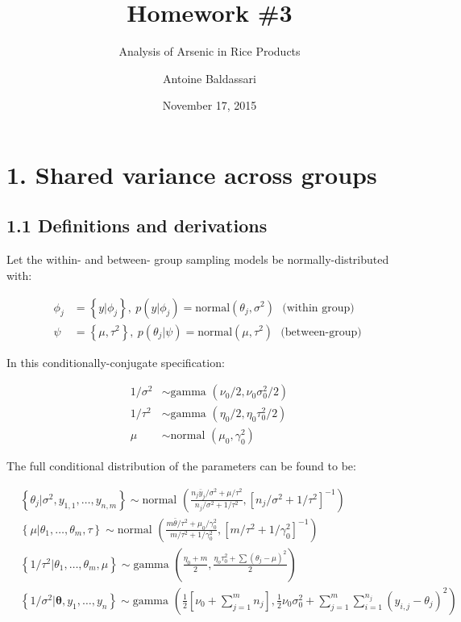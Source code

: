 \documentclass[]{article}
\title{Homework \#3}
\subtitle{Analysis of Arsenic in Rice Products}
\author{Antoine Baldassari}
\date{November 17, 2015}
\begin{document}
\maketitle


\section{1. Shared variance across groups}\subsection{1.1 Definitions and derivations}

Let the within- and between- group sampling models be
normally-distributed with:

\begin{align*}
        \phi_j &= \left\{ y | \phi_j \right\}, \ p(y|\phi_j) = \text{normal}(\theta_j, \sigma^2) \text{~ (within group) } \\
        \psi &= \left\{ \mu, \tau^2 \right\}, \ p(\theta_j|\psi) = \text{normal}(\mu, \tau^2) \text{~ (between-group) }
    \end{align*}

In this conditionally-conjugate specification:

\begin{align*}
        1/\sigma^2 & \sim \text{gamma }(\nu_0/2, \nu_0\sigma^2_0/2)\\
        1/\tau^2 & \sim \text{gamma }(\eta_0/2,\eta_0\tau_0^2/2)\\
        \mu & \sim \text{normal }(\mu_0, \gamma_0^2)
    \end{align*}

The full conditional distribution of the parameters can be found to be:

\begin{align*}
        & \left\{ \theta_j | \sigma^2, y_{1,1},\ldots,y_{n,m} \right\} \sim \text{normal }\left( \frac{n_j\bar{y}_j/\sigma^2+\mu/\tau^2}{n_j/\sigma^2 + 1/\tau^2}, \left[ n_j/\sigma^2+1/\tau^2\right]^{-1} \right) \\
        & \left\{\mu | \theta_1,\ldots,\theta_m,\tau \right\} \sim \text{normal } \left( \frac{m\bar{\theta}/\tau^2 + \mu_0/\gamma_0^2}{m/\tau^2+1/\gamma_0^2},\left[ m/\tau^2 + 1/\gamma_0^2\right]^{-1} \right)\\
        & \left\{ 1/\tau^2 | \theta_1, \ldots, \theta_m, \mu \right\} \sim \text{gamma }\left( \frac{\eta_0 +m}{2},\frac{\eta_o\tau^2_0+\sum\left(\theta_j -\mu \right)^2}{2} \right) \\
        & \left\{1/\sigma^2 | \boldsymbol{\theta}, y_1, \ldots, y_n \right\} \sim \text{gamma }\left( \frac{1}{2}\left[ \nu_0 + \sum\limits_{j=1}^m n_j \right], \frac{1}{2}\nu_0\sigma_0^2 + \sum\limits_{j=1}^m \sum\limits_{i=1}^{n_j} \left(y_{i,j} -\theta_j \right)^2 \right)
    \end{align*}
\end{document}
